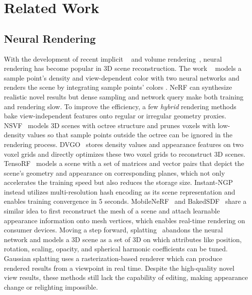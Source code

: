 \section{Related Work}

\subsection{Neural Rendering}
With the development of recent implicit ~\cite{OccNet, IMNet, DeepSDF} and volume rendering~\cite{DVR}, neural rendering has become popular in 3D scene reconstruction. 
The  work ~\cite{NeRF} models a sample point's density and view-dependent color with two neural networks and renders the scene by integrating sample points' colors . 
NeRF can synthesize realistic novel  results but dense sampling and network query make both training and rendering slow. 
To improve the efficiency, a few \textit{hybrid} rendering methods bake view-independent features onto regular or irregular geometry proxies.  
NSVF~\cite{NSVF} models 3D scenes with  octree structure and prunes voxels with low-density values so that sample points outside the octree can be ignored in the rendering process. 
DVGO~\cite{DVGO} stores density values and appearance features on two voxel grids and directly optimizes these two voxel grids to reconstruct 3D scenes. 
TensoRF~\cite{TensoRF} models a scene with a set of matrices and vector pairs that depict the scene's geometry and appearance on corresponding planes, which not only accelerates the training speed but also reduces the storage size. 
Instant-NGP~\cite{InstantNGP} instead utilizes multi-resolution hash encoding as its scene representation and enables training convergence in  5 seconds.  
MobileNeRF~\cite{MobileNeRF} and BakedSDF~\cite{BakedSDF} share a similar idea to first reconstruct the mesh of a scene and attach learnable appearance information onto mesh vertices, which enables real-time rendering on consumer devices. 
Moving a step forward,  splatting~\cite{GS} abandons the neural network and models a 3D scene as a set of 3D  on which attributes like position, rotation, scaling, opacity, and spherical harmonic coefficients can be tuned. 
Gaussian splatting uses a rasterization-based renderer which can produce rendered results from a viewpoint in real time.
Despite the high-quality novel view results, these methods still lack the capability of editing, making appearance change or relighting impossible.

